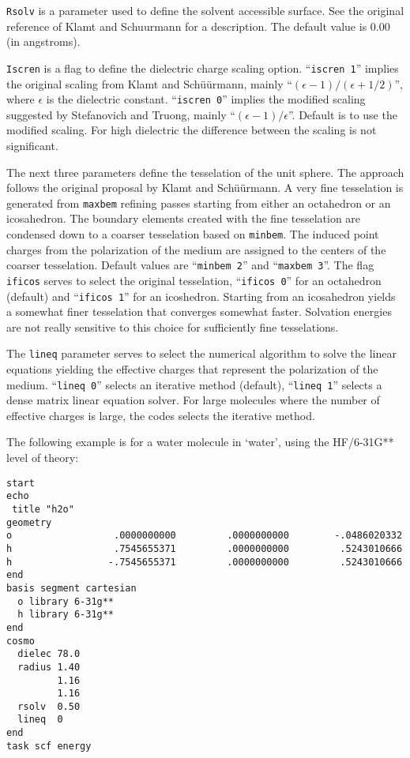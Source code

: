 \verb+Rsolv+ is a parameter used to define the solvent accessible
surface. See the original reference of Klamt and Schuurmann for a
description. The default value is 0.00 (in angstroms).

\verb+Iscren+ is a flag to define the dielectric charge scaling option.
``{\tt iscren 1}'' implies the original scaling from Klamt and Sch\"{u}\"{u}rmann,
mainly ``$(\epsilon-1)/(\epsilon+1/2)$'', where $\epsilon$ is the dielectric constant.
``{\tt iscren 0}'' implies the modified scaling suggested by Stefanovich and
Truong, mainly ``$(\epsilon-1)/\epsilon$''. Default is to use the modified scaling.
For high dielectric the difference between the scaling is not 
significant.

The next three parameters define the tesselation of the unit sphere.
The approach follows the original proposal by Klamt and Sch\"{u}\"{u}rmann.
A very fine tesselation is generated from \verb+maxbem+ refining 
passes starting from either an octahedron or an icosahedron. The
boundary elements created with the fine tesselation are condensed
down to a coarser tesselation based on \verb+minbem+. The induced
point charges from the polarization of the medium are assigned to
the centers of the coarser tesselation. Default values are
``{\tt minbem 2}'' and ``{\tt maxbem 3}''. The flag \verb+ificos+ serves to
select the original tesselation, ``{\tt ificos 0}'' for an octahedron
(default) and ``{\tt ificos 1}'' for an icoshedron. Starting from an icosahedron
yields a somewhat finer tesselation that converges somewhat faster.
Solvation energies are not really sensitive to this choice for
sufficiently fine tesselations.

The \verb+lineq+ parameter serves to select the numerical algorithm to solve
the linear equations yielding the effective charges that represent
the polarization of the medium. ``{\tt lineq 0}'' selects an iterative method 
(default), ``{\tt lineq 1}'' selects a dense matrix linear equation solver.
For large molecules where the number of effective charges is large,
the codes selects the iterative method.

The following example is for a water molecule in `water', using
the HF/6-31G** level of theory:

\begin{verbatim}
start
echo
 title "h2o"
geometry
o                  .0000000000         .0000000000        -.0486020332
h                  .7545655371         .0000000000         .5243010666
h                 -.7545655371         .0000000000         .5243010666
end
basis segment cartesian
  o library 6-31g**
  h library 6-31g**
end
cosmo
  dielec 78.0
  radius 1.40
         1.16
         1.16
  rsolv  0.50
  lineq  0
end
task scf energy
\end{verbatim}
